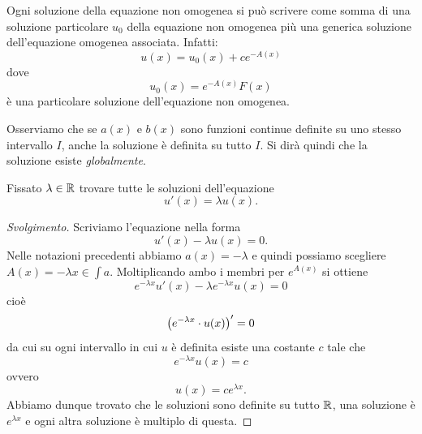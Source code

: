 Ogni soluzione della equazione non omogenea si può scrivere come somma di una
soluzione particolare $u_0$ della equazione non omogenea
più una generica soluzione dell'equazione omogenea associata. Infatti:
\[
  u(x) = u_0(x) + c e^{-A(x)}
\]
dove
\[
  u_0(x) = e^{-A(x)}F(x)
\]
è una particolare soluzione dell'equazione non omogenea.

Osserviamo che se $a(x)$ e $b(x)$ sono funzioni continue definite su uno stesso
intervallo $I$, anche la soluzione è definita su tutto $I$.
Si dirà quindi che la soluzione esiste \emph{globalmente}.

\begin{exercise}%
  \label{ex:58230978}
Fissato $\lambda \in {\mathbb R}$ trovare tutte le soluzioni dell'equazione
\[
  u'(x) = \lambda u(x).
\]
\end{exercise}
%
\begin{proof}[Svolgimento]
Scriviamo l'equazione nella forma
\[
  u'(x) - \lambda u(x) = 0.
\]
Nelle notazioni precedenti abbiamo $a(x) = -\lambda$ e quindi possiamo scegliere $A(x) = -\lambda x \in \int a$.
Moltiplicando ambo i membri per $e^{A(x)}$ si ottiene
\[
  e^{-\lambda x} u'(x) - \lambda e^{-\lambda x} u(x) = 0
\]
cioè
\[
 {\left( e^{-\lambda x}\cdot u(x) \right)}' = 0
\]
da cui su ogni intervallo in cui $u$ è definita esiste una costante $c$ tale che
\[
  e^{-\lambda x} u(x) = c
\]
ovvero
\[
  u(x) = c e^{\lambda x}.
\]
Abbiamo dunque trovato che le soluzioni sono definite su tutto ${\mathbb R}$, una soluzione è $e^{\lambda x}$ e ogni altra soluzione è multiplo di questa.
\end{proof}

